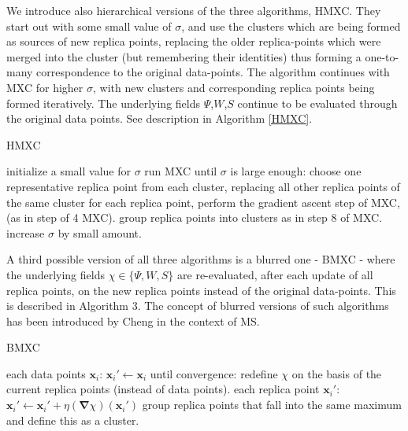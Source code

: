 \documentclass[preprint,12pt]{elsarticle}
\begin{document}
We introduce also hierarchical versions of the three algorithms, HMXC. They start out with some small value of $\sigma$, and use the clusters which are being formed as sources of new replica points, replacing the older replica-points which were merged into the cluster (but remembering their identities) thus forming a one-to-many correspondence to the original data-points. The algorithm continues with MXC for higher $\sigma$, with new clusters and corresponding replica points being formed iteratively. The underlying fields  $\Psi$,$W$,$S$ continue to be evaluated through the original data points. See description in Algorithm \ref{HMXC}.

\begin{algorithm}
\caption{HMXC}\label{HMXC}
\begin{algorithmic}[1]
\State initialize a small value for $\sigma$
\State run MXC
\MRepeat until $\sigma$ is large enough:
	\State choose one representative replica point from each cluster, replacing all other replica points of the same cluster
	\State for each replica point, perform the gradient ascent step of MXC, (as in step of 4 MXC).
	\State group replica points into clusters as in step 8 of MXC.
	\State increase $\sigma$ by small amount.
\EndMRepeat
\end{algorithmic}
\end{algorithm}

A third possible version of all three algorithms is a blurred one - BMXC - where the underlying fields $\chi \in \{\Psi,W,S\}$ are re-evaluated, after each update of all replica points, on the new replica points instead of the original data-points. This is described in Algorithm 3. The concept of blurred versions of such algorithms has been introduced by Cheng \cite{cheng1995} in the context of MS.

\begin{algorithm}
\caption{BMXC}\label{BMXC}
\begin{algorithmic}[1]
\MFor each data points $\mathbf{x}_i$:
	\State $\mathbf{x}_i' \gets \mathbf{x}_i$
\EndMFor
\MRepeat until convergence:
	\State redefine $\chi$ on the basis of the current replica points (instead of data points).
	\MFor each replica point $\mathbf{x}_i'$:
		\State $\mathbf{x}_i' \gets \mathbf{x}_i'+\eta\left(\boldsymbol{\nabla}\chi\right)\left(\mathbf{x}_i'\right)$
	\EndMFor
\EndMRepeat
\State group replica points that fall into the same maximum and define this as a cluster.
\end{algorithmic}
\end{algorithm}
\end{document}
